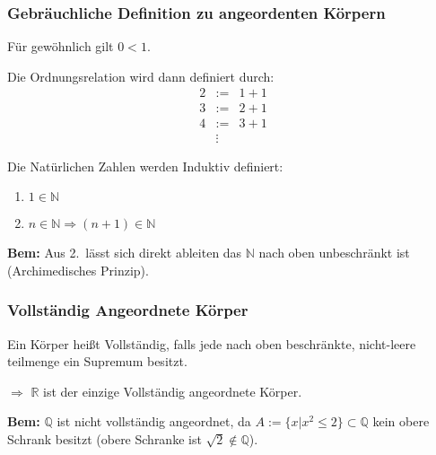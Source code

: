 \documentclass[10pt]{article}
\newcommand{\N}{\mathbb{N}}
\newcommand{\Q}{\mathbb{Q}}
\newcommand{\R}{\mathbb{R}}
\begin{document}
    \subsubsection{Gebräuchliche Definition zu angeordenten Körpern}
    Für gewöhnlich gilt $0<1$.

     Die Ordnungsrelation wird dann definiert durch:
    \begin{eqnarray*}
        2&:=& 1+1 \\
        3&:=& 2+1 \\
        4&:=&3+1 \\
        &\vdots&
    \end{eqnarray*}

     Die Natürlichen Zahlen werden Induktiv definiert:
    \begin{enumerate}
        \item $1 \in \mathbb{N}$
        \item $n \in \mathbb{N} \Rightarrow (n+1)\in\mathbb{N}$
    \end{enumerate}

    \textbf{Bem:}
    Aus 2.\ lässt sich direkt ableiten das $\N$ nach oben unbeschränkt ist (Archimedisches Prinzip).

    \subsubsection{Vollständig Angeordnete Körper}
    Ein Körper heißt Vollständig, falls jede nach oben beschränkte, nicht-leere
    teilmenge ein Supremum besitzt.

    $\Rightarrow$ $\R$ ist der einzige Vollständig angeordnete Körper.

    \textbf{Bem:} $\Q$ ist nicht vollständig angeordnet, da
    $A := \{x | x^2 \leq 2\} \subset \mathbb{Q}$ kein obere Schrank besitzt
    (obere Schranke ist $\sqrt{2} \notin \mathbb{Q}$).
\end{document}

